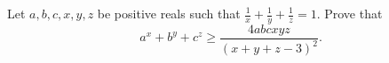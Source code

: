 Let $a, b, c,x, y, z$ be positive reals such that $\frac{1}{x}+\frac{1}{y}+\frac{1}{z}=1$. Prove that \[a^x+b^y+c^z\ge \frac{4abcxyz}{(x+y+z-3)^2}.\]
